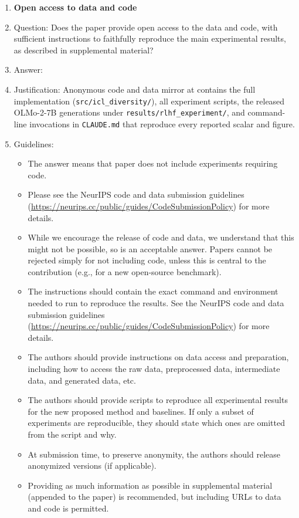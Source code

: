 \begin{enumerate}
\item {\bf Open access to data and code}
    \item[] Question: Does the paper provide open access to the data and code, with sufficient instructions to faithfully reproduce the main experimental results, as described in supplemental material?
    \item[] Answer: \answerYes{}
    \item[] Justification: Anonymous code and data mirror at \projectGithubUrl{} contains the full implementation (\texttt{src/icl\_diversity/}), all experiment scripts, the released OLMo-2-7B generations under \texttt{results/rlhf\_experiment/}, and command-line invocations in \texttt{CLAUDE.md} that reproduce every reported scalar and figure.
    \item[] Guidelines:
    \begin{itemize}
        \item The answer \answerNA{} means that paper does not include experiments requiring code.
        \item Please see the NeurIPS code and data submission guidelines (\url{https://neurips.cc/public/guides/CodeSubmissionPolicy}) for more details.
        \item While we encourage the release of code and data, we understand that this might not be possible, so \answerNo{} is an acceptable answer. Papers cannot be rejected simply for not including code, unless this is central to the contribution (e.g., for a new open-source benchmark).
        \item The instructions should contain the exact command and environment needed to run to reproduce the results. See the NeurIPS code and data submission guidelines (\url{https://neurips.cc/public/guides/CodeSubmissionPolicy}) for more details.
        \item The authors should provide instructions on data access and preparation, including how to access the raw data, preprocessed data, intermediate data, and generated data, etc.
        \item The authors should provide scripts to reproduce all experimental results for the new proposed method and baselines. If only a subset of experiments are reproducible, they should state which ones are omitted from the script and why.
        \item At submission time, to preserve anonymity, the authors should release anonymized versions (if applicable).
        \item Providing as much information as possible in supplemental material (appended to the paper) is recommended, but including URLs to data and code is permitted.
    \end{itemize}



\end{enumerate}
